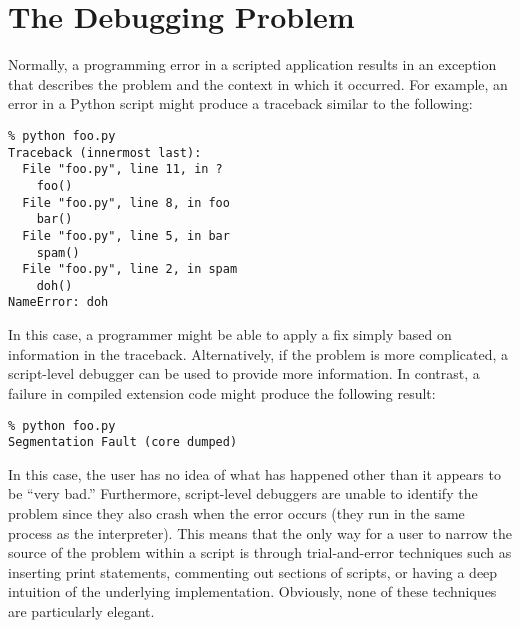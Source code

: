 \section{The Debugging Problem}

Normally, a programming error in a scripted application 
results in an exception that describes the problem and the context in
which it occurred.  For example, an error in a Python script might
produce a traceback similar to the following:

\begin{verbatim}
% python foo.py
Traceback (innermost last):
  File "foo.py", line 11, in ?
    foo()
  File "foo.py", line 8, in foo
    bar()
  File "foo.py", line 5, in bar
    spam()
  File "foo.py", line 2, in spam
    doh()
NameError: doh
\end{verbatim}

In this case, a programmer might be able to apply a fix simply based
on information in the traceback.  Alternatively, if the problem is
more complicated, a script-level debugger can be used to provide more
information.  In contrast, a failure in compiled extension code might
produce the following result:

\begin{verbatim}
% python foo.py
Segmentation Fault (core dumped)
\end{verbatim}

In this case, the user has no idea of what has happened other than it
appears to be ``very bad.''  Furthermore, script-level debuggers are
unable to identify the problem since they also crash when the error
occurs (they run in the same process as the interpreter).  This means
that the only way for a user to narrow the source of the problem
within a script is through trial-and-error techniques such as
inserting print statements, commenting out sections of scripts, or
having a deep intuition of the underlying implementation. Obviously,
none of these techniques are particularly elegant.


